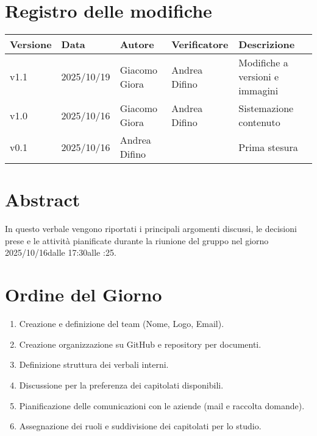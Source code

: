 \documentclass[a4paper,12pt]{article}
\newcommand{\DataVerbale}{2025/10/16}
\newcommand{\OraInizio}{17:30}
\newcommand{\OraFine}{19:25}
\newcommand{\AbstractVerbale}{%
In questo verbale vengono riportati i principali argomenti discussi, le decisioni prese e le attività pianificate durante la riunione del gruppo nel giorno \DataVerbale \space dalle \OraInizio \space alle \space \OraFine .
}
\newcommand{\VersioneVerbale}{v1.1} %
\begin{document}
\section*{Registro delle modifiche}{
    \begin{center} 
        \begin{tabular}{|l|l|l|l|l|}
            \hline
            \textbf{Versione} & \textbf{Data} & \textbf{Autore} & \textbf{Verificatore} & \textbf{Descrizione} \\
            \hline
            \VersioneVerbale & 2025/10/19 & Giacomo Giora & Andrea Difino & Modifiche a versioni e immagini\\
            \hline
            v1.0 & \DataVerbale & Giacomo Giora & Andrea Difino & Sistemazione contenuto\\
            \hline
            v0.1 & \DataVerbale & Andrea Difino & & Prima stesura\\
            \hline
        \end{tabular}
    \end{center}
}

\newpage

\tableofcontents

\newpage
\section{Abstract}{
    \begin{minipage}{0.9\textwidth}
        \small
        \AbstractVerbale
    \end{minipage}
}


\section{Ordine del Giorno}{
    \begin{enumerate}
        \item Creazione e definizione del team (Nome, Logo, Email).
        \item Creazione organizzazione su GitHub e repository per documenti.
        \item Definizione struttura dei verbali interni.
        \item Discussione per la preferenza dei capitolati disponibili.
        \item Pianificazione delle comunicazioni con le aziende (mail e raccolta domande).
        \item Assegnazione dei ruoli e suddivisione dei capitolati per lo studio.
    \end{enumerate}
}
\end{document}
